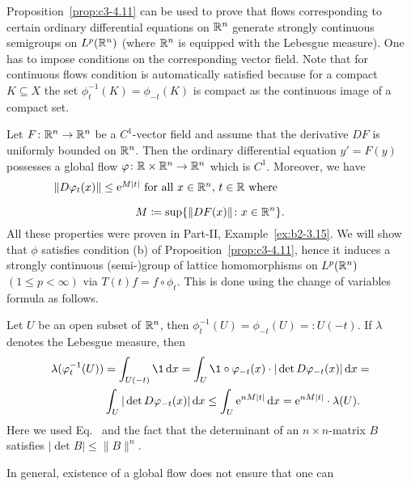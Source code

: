 Proposition~\ref{prop:c3-4.11} can be used to prove that flows corresponding to certain
ordinary differential equations on $\mathbb{R} ^n$ generate strongly continuous
semigroups on $L^p(\mathbb{R} ^n)$ (where $\mathbb{R} ^n$ is equipped with the Lebesgue
measure). One has to impose conditions on the corresponding vector
field. Note that for continuous flows condition  is automatically satisfied because for a compact $K \subseteq X$ the set $\phi_t^{-1}(K) = \phi_{-t}(K)$
is compact as the continuous image of a compact set.
\begin{example}\label{ex:c3-4.12}
Let $F \colon \mathbb{R} ^n \to \mathbb{R} ^n$ be a $C^1$-vector field and assume that
the derivative $DF$ is uniformly bounded on $\mathbb{R} ^n$. Then the ordinary
differential equation $y' = F(y)$ possesses a global flow
$\phi \colon \R  \times \R ^n \to \R ^n$ which is $C^1$. Moreover, we have
\begin{equation}\label{eq:c3-4.13}
\begin{minipage}{.8\textwidth} 
$\|D\phi_t(x)\| \leq \eu^{M|t|}$  for all  $x \in \R ^n$, $t \in \R$  where   
%
\[
	M \coloneq  \sup \{\|DF(x)\| \colon x \in \R ^n\}.
\]
% 
\end{minipage}
\end{equation}
All these properties were proven in Part-II, Example~\ref{ex:b2-3.15}.
We will show that $\phi$ satisfies condition (b) of Proposition~\ref{prop:c3-4.11},
hence it induces a strongly continuous (semi-)group of lattice homomorphisms
on $L^p(\mathbb{R} ^n)$ $(1 \leq p < \infty)$ via $T(t)f = f \circ \phi_t$.
This is done using the change of variables formula as follows.

Let $U$ be an open subset of\/ $\mathbb{R} ^n$, then $\phi_t^{-1}(U) = \phi_{-t}(U) =\colon U(-t)$. 
If\/ $\lambda$ denotes the Lebesgue measure, then
\begin{equation}\label{eq:c3-4.14}
	\begin{split}
		\lambda(\phi_t^{-1}(U)) &= \int_{U(-t)} \1 \dx  = \int_{U} \1 \circ \phi_{-t}(x) \cdot |\det D\phi_{-t}(x)| \dx  = \\
		&\int_{U} |\det D\phi_{-t}(x)| \dx  \leq \int_{U} \eu^{nM|t|} \dx  = \eu^{nM|t|} \cdot \lambda(U).
	\end{split}
\end{equation}
Here we used Eq.~ and the fact that the determinant of an $n\times n$-matrix
$B$ satisfies $|\det B| \leq \|B\|^n$. 
\end{example}
In general, existence of a global flow does not ensure that one can
